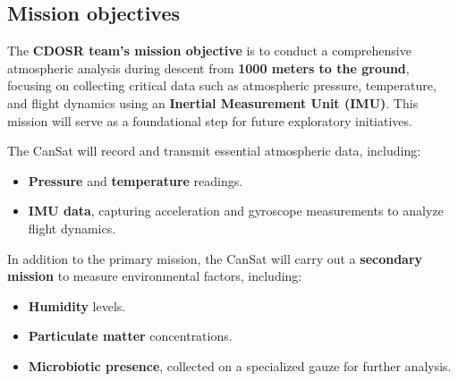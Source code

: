 \subsection{Mission objectives}


\vspace{0.5cm}


The \textbf{CDOSR team’s mission objective} is to conduct a comprehensive atmospheric analysis during descent from \textbf{1000 meters to the ground}, focusing on collecting critical data such as atmospheric pressure, temperature, and flight dynamics using an \textbf{Inertial Measurement Unit (IMU)}. This mission will serve as a foundational step for future exploratory initiatives.  

The CanSat will record and transmit essential atmospheric data, including:
\begin{itemize}[leftmargin=1.27cm, itemindent=0cm, topsep=2pt]
    \item \textbf{Pressure} and \textbf{temperature} readings.
    \item \textbf{IMU data}, capturing acceleration and gyroscope measurements to analyze flight dynamics.
\end{itemize}

In addition to the primary mission, the CanSat will carry out a \textbf{secondary mission} to measure environmental factors, including:
\begin{itemize}[leftmargin=1.27cm, itemindent=0cm, topsep=2pt]
    \item \textbf{Humidity} levels.
    \item \textbf{Particulate matter} concentrations.
    \item \textbf{Microbiotic presence}, collected on a specialized gauze for further analysis.
\end{itemize}

